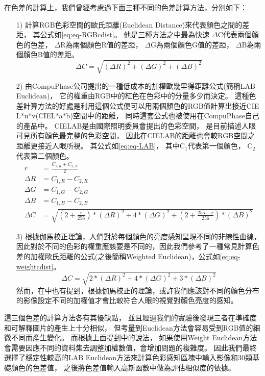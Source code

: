 \documentclass[class=NCU_thesis, crop=false]{standalone}
\begin{document}
			在色差的計算上，我們曾經考慮過下面三種不同的色差計算方法，分別如下：
			\begin{itemize}
			  \item [1)] 
			  	計算RGB色彩空間的歐氏距離(Euclidean Distance)來代表顏色之間的差距，
			  	其公式如\cref{eq:eq-RGBcdist}。
			  	他是三種方法之中最為快速
			  	$\Delta$C代表兩個顏色的色差，
			  	$\Delta$R為兩個顏色R值的差距，
			  	$\Delta$G為兩個顏色G值的差距，
			  	$\Delta$B為兩個顏色B值的差距。
			  	\begin{equation}
			    \label{eq:eq-RGBcdist}
			    	\Delta C = \sqrt{(\Delta R)^2 + (\Delta G)^2 + (\Delta B)^2}
				\end{equation}

			  \item [2)]
			  	由CompuPhase公司提出的一種低成本的加權歐幾里得距離公式\cite{LABformula}(簡稱LAB Euclidean)，
			  	它的權重由RGB中的紅色在色彩中的分量多少而決定。
			  	這種色差計算方法的好處是利用這個公式便可以用兩個顏色的RGB值計算出接近CIE L*u*v(CIEL*a*b)空間中的距離，
			  	同時這套公式也被使用在CompuPhase自己的產品中。
			  	CIELAB是由國際照明委員會提出的色彩空間，
			  	是目前描述人眼可見所有顏色最完整的色彩空間，
			  	因此在CIELAB的距離也會較RGB空間之距離更接近人眼所視。
			  	其公式如\cref{eq:eq-LAB}，
			  	其中C$_{1}$代表第一個顏色，
			  	C$_{2}$代表第二個顏色。
			  	\begin{equation}
			    \label{eq:eq-LAB}
			    \begin{split}
			    	\overline{r} & = \frac{C_{1,R} + C_{2,R}}{2} \\
			    	\Delta R & = C_{1,R} - C_{2,R} \\
			    	\Delta G & = C_{1,G} - C_{2,G} \\
			    	\Delta B & = C_{1,B} - C_{2,B} \\
			    	\Delta C & = \sqrt{(2 + \frac{\overline{r}}{256}) * (\Delta R)^2 + 4 * (\Delta G)^2 + (2 + \frac{255 - \overline{r}}{256}) * (\Delta B)^2}
			    \end{split}
				\end{equation}

			  \item [3)]
			  	根據伽馬校正理論，人們對於每個顏色的亮度感知呈現不同的非線性曲線，因此對於不同的色彩的權重應該要是不同的，因此我們參考了一種常見計算色差的加權歐氏距離的公式(之後簡稱Weighted Euclidean)，公式如\cref{eq:eq-weightcdist}。
			  	\begin{equation}
			    \label{eq:eq-weightcdist}
			    	\Delta C = \sqrt{2 * (\Delta R)^2 + 4 * (\Delta G)^2 + 3 * (\Delta B)^2}
				\end{equation}
				然而，在\cite{LABformula}中也有提到，根據伽馬校正的理論，或許我們應該對不同的顏色分布的影像設定不同的加權值才會比較符合人眼的視覺對顏色亮度的感知。
			\end{itemize}
			這三個色差的計算方法各有其優缺點，
			並且經過我們的實驗後發現三者在準確度和可解釋圖片的產生上十分相似，
			但考量到Euclidean方法會容易受到RGB值的細微不同而產生變化。
			而根據上面提到\cite{LABformula}中的說法，
			如果使用Weight Euclidean方法會需要因應不同的資料集去調整加權數值，會增加問題的複雜度。
			因此我們最終選擇了穩定性較高的LAB Euclidean方法來計算色彩感知區塊中輸入影像和30類基礎顏色的色差值，
			之後將色差值輸入高斯函數中做為評估相似度的依據。
\end{document}
